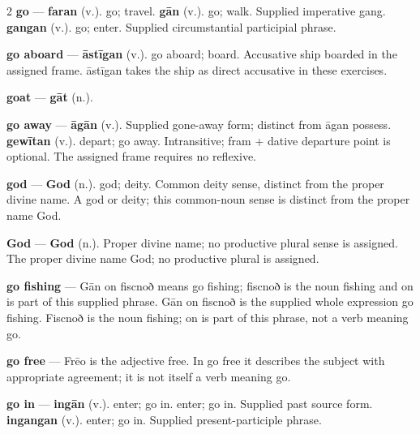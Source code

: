 \begin{multicols}{2}
\textbf{go} — \textbf{faran} (v.). go; travel. \textbf{gān} (v.). go; walk. Supplied imperative gang. \textbf{gangan} (v.). go; enter. Supplied circumstantial participial phrase.\par
\textbf{go aboard} — \textbf{āstīgan} (v.). go aboard; board. Accusative ship boarded in the assigned frame. āstīgan takes the ship as direct accusative in these exercises.\par
\textbf{goat} — \textbf{gāt} (n.).\par
\textbf{go away} — \textbf{āgān} (v.). Supplied gone-away form; distinct from āgan possess. \textbf{gewītan} (v.). depart; go away. Intransitive; fram + dative departure point is optional. The assigned frame requires no reflexive.\par
\textbf{god} — \textbf{God} (n.). god; deity. Common deity sense, distinct from the proper divine name. A god or deity; this common-noun sense is distinct from the proper name God.\par
\textbf{God} — \textbf{God} (n.). Proper divine name; no productive plural sense is assigned. The proper divine name God; no productive plural is assigned.\par
\textbf{go fishing} — Gān on fiscnoð means go fishing; fiscnoð is the noun fishing and on is part of this supplied phrase. Gān on fiscnoð is the supplied whole expression go fishing. Fiscnoð is the noun fishing; on is part of this phrase, not a verb meaning go.\par
\textbf{go free} — Frēo is the adjective free. In go free it describes the subject with appropriate agreement; it is not itself a verb meaning go.\par
\textbf{go in} — \textbf{ingān} (v.). enter; go in. enter; go in. Supplied past source form. \textbf{ingangan} (v.). enter; go in. Supplied present-participle phrase.\par

\end{multicols}

